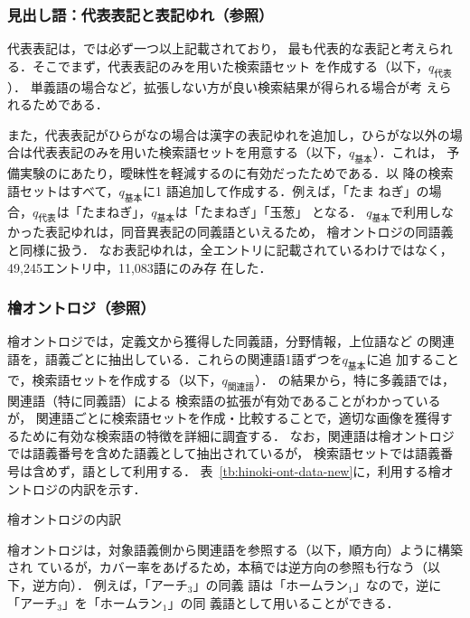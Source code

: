 \documentclass[japanese]{jnlp_1.4}
\newcommand{\refsec}[1]{}
\newcommand{\lxd}{}
\newcommand{\mono}{}
\begin{document}
\subsubsection{見出し語：代表表記と表記ゆれ（\refsec{sec:lexeed}参照）}

代表表記は，\lxd{}では必ず一つ以上記載されており，
最も代表的な表記と考えられる．そこでまず，代表表記のみを用いた検索語セット
を作成する（以下，$q_{代表}$）．
単義語の場合など，拡張しない方が良い検索結果が得られる場合が考
えられるためである．


また，代表表記がひらがなの場合は漢字の表記ゆれを追加し，ひらがな以外の場
合は代表表記のみを用いた検索語セットを用意する（以下，$q_{基本}$）．これは，
予備実験の\mono{}にあたり，曖昧性を軽減するのに有効だったためである．以
降の検索語セットはすべて，$q_{基本}$に1 語追加して作成する．例えば，「たま
ねぎ」の場合，$q_{代表}$は「たまねぎ」，$q_{基本}$は「たまねぎ」「玉葱」
となる．
$q_{基本}$で利用しなかった表記ゆれは，同音異表記の同義語といえるため，
檜オントロジの同語義と同様に扱う．
なお表記ゆれは，全エントリに記載されているわけではなく，49,245エントリ中，11,083語にのみ存
在した．


\subsubsection{檜オントロジ（\refsec{sec:lexeed}参照）}

檜オントロジでは，定義文から獲得した同義語，分野情報，上位語など
の関連語を，語義ごとに抽出している．これらの関連語1語ずつを$q_{基本}$に追
加することで，検索語セットを作成する（以下，$q_{関連語}$）．
\refsec{sec:pre-exp}の結果から，特に多義語では，関連語（特に同義語）による
検索語の拡張が有効であることがわかっているが，
関連語ごとに検索語セットを作成・比較することで，適切な画像を獲得す
るために有効な検索語の特徴を詳細に調査する．
なお，関連語は檜オントロジでは語義番号を含めた語義として抽出されているが，
検索語セットでは語義番号は含めず，語として利用する．
表~\ref{tb:hinoki-ont-data-new}に，利用する檜オントロジの内訳を示す．

\begin{table}[t]
\caption{檜オントロジの内訳}
\label{tb:hinoki-ont-data-new}

\end{table}

檜オントロジは，対象語義側から関連語を参照する（以下，順方向）ように構築され
ているが，カバー率をあげるため，本稿では逆方向の参照も行なう（以下，逆方向）．
例えば，「アーチ$_3$」の同義
語は「ホームラン$_1$」なので，逆に「アーチ$_3$」を「ホームラン$_1$」の同
義語として用いることができる．
\end{document}
